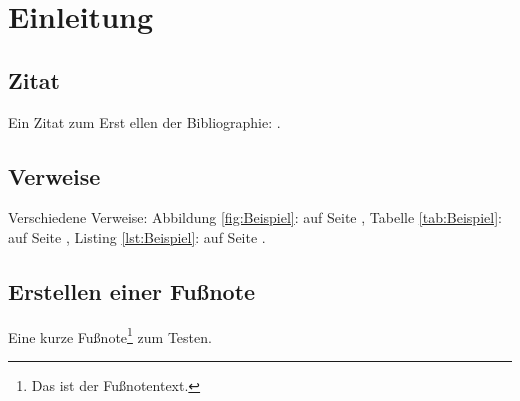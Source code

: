 \section{Einleitung}
\label{sec:Einleitung}

\subsection{Zitat}
\label{ssec:Zitat} %
Ein Zitat zum Erst ellen der Bibliographie: \cite[\vgl][S. 22]{Martin2008a}.

\subsection{Verweise}
\label{ssec:Verweise}
Verschiedene Verweise: Abbildung \ref{fig:Beispiel}:  auf Seite \pageref{fig:Beispiel}, Tabelle \ref{tab:Beispiel}:  auf Seite \pageref{tab:Beispiel}, Listing \ref{lst:Beispiel}:  auf Seite \pageref{lst:Beispiel}.

\subsection{Erstellen einer Fußnote}
\label{ssec:Fußnote}
Eine kurze Fußnote\footnote{Das ist der Fußnotentext.} zum Testen.